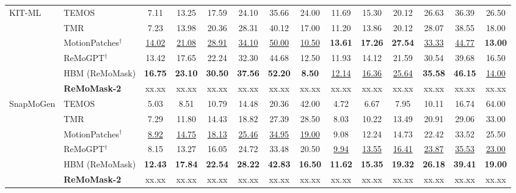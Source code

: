 \documentclass[10pt,journal,compsoc]{IEEEtran}
\begin{document}
\begin{table}[t!]
{\begin{tabular}{l|l|cccccc|cccccc}
        \multirow{6}{*}{KIT-ML}
        & TEMOS~\cite{temos}
        & 7.11 & 13.25 & 17.59 & 24.10 & 35.66 & 24.00
        & 11.69 & 15.30 & 20.12 & 26.63 & 36.39 & 26.50 \\
        & TMR~\cite{tmr}
        & 7.23 & 13.98 & 20.36 & 28.31 & 40.12 & 17.00
        & 11.20 & 13.86 & 20.12 & 28.07 & 38.55 & 18.00 \\
        & MotionPatches$^{\dag}$~\cite{motionpatches}
        & \underline{14.02} & \underline{21.08} & \underline{28.91} & \underline{34.10} & \underline{50.00} & \underline{10.50}
        & \textbf{13.61} & \textbf{17.26} & \textbf{27.54} & \underline{33.33} & \underline{44.77} & \textbf{13.00} \\
        & ReMoGPT$^{\dag}$~\cite{remogpt}
        & 13.42 & 17.65 & 22.24 & 32.30 & 44.68 & 12.50
        & 11.93 & 14.12 & 21.59 & 30.54 & 39.68 & 16.50 \\
        \rowcolor[gray]{0.90} \cellcolor{white} & HBM (ReMoMask)
        & \textbf{16.75} & \textbf{23.10} & \textbf{30.50} & \textbf{37.56} & \textbf{52.20} & \textbf{8.50}
        & \underline{12.14} & \underline{16.36} & \underline{25.64} & \textbf{35.58} & \textbf{46.15} & \underline{14.00} \\
        \rowcolor{yellow!20} \cellcolor{white} & \textbf{ReMoMask-2}
        & xx.xx & xx.xx & xx.xx & xx.xx & xx.xx & xx.xx
        & xx.xx & xx.xx & xx.xx & xx.xx & xx.xx & xx.xx \\
        \midrule

        \multirow{6}{*}{SnapMoGen}
        & TEMOS~\cite{temos} & 5.03 & 8.51 & 10.79 & 14.48 & 20.36 & 42.00
        & 4.72 & 6.67 & 7.95 & 10.11 & 16.74 & 64.00 \\
        & TMR~\cite{tmr} & 7.29 & 11.80 & 14.43 & 18.82 & 27.39 & 28.50
        & 8.03 & 10.22 & 13.49 & 20.91 & 29.06 & 33.00 \\
        & MotionPatches$^{\dag}$~\cite{motionpatches} & \underline{8.92} & \underline{14.75} & \underline{18.13} & \underline{25.46} & \underline{34.95} & \underline{19.00}
        & 9.08 & 12.24 & 14.73 & 22.42 & 33.52 & 25.50 \\
        & ReMoGPT$^{\dag}$~\cite{remogpt} & 8.15 & 13.27 & 16.05 & 24.72 & 33.48 & 20.50 
        & \underline{9.94} & \underline{13.55} & \underline{16.41} & \underline{23.87} & \underline{35.53} & \underline{23.00} \\
        \rowcolor[gray]{0.90} \cellcolor{white} & HBM (ReMoMask) & \textbf{12.43} & \textbf{17.84} & \textbf{22.54} & \textbf{28.22} & \textbf{42.83} & \textbf{16.50}
        & \textbf{11.62} & \textbf{15.35} & \textbf{19.32} & \textbf{26.18} & \textbf{39.41} & \textbf{19.00} \\
        \rowcolor{yellow!20} \cellcolor{white} & \textbf{ReMoMask-2}
        & xx.xx & xx.xx & xx.xx & xx.xx & xx.xx & xx.xx
        & xx.xx & xx.xx & xx.xx & xx.xx & xx.xx & xx.xx \\
        \bottomrule
    \end{tabular}
}
\end{table}
\end{document}
